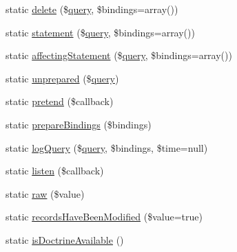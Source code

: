 \begin{DoxyCompactItemize}
\item 
static \mbox{\hyperlink{class_illuminate_1_1_support_1_1_facades_1_1_d_b_ae272dffec731836e5186ff97ac416ffa}{delete}} (\$\mbox{\hyperlink{class_illuminate_1_1_support_1_1_facades_1_1_d_b_ae52c1b74f0ded858ed2dae6342fe5d96}{query}}, \$bindings=array())
\item 
static \mbox{\hyperlink{class_illuminate_1_1_support_1_1_facades_1_1_d_b_abe9fe35abfd29aa9bccba94a269c9f25}{statement}} (\$\mbox{\hyperlink{class_illuminate_1_1_support_1_1_facades_1_1_d_b_ae52c1b74f0ded858ed2dae6342fe5d96}{query}}, \$bindings=array())
\item 
static \mbox{\hyperlink{class_illuminate_1_1_support_1_1_facades_1_1_d_b_a1ab200d539f4612e0baf5c935b8f73fe}{affecting\+Statement}} (\$\mbox{\hyperlink{class_illuminate_1_1_support_1_1_facades_1_1_d_b_ae52c1b74f0ded858ed2dae6342fe5d96}{query}}, \$bindings=array())
\item 
static \mbox{\hyperlink{class_illuminate_1_1_support_1_1_facades_1_1_d_b_a2e5507820b20e6d516bcdeb6c48bcc76}{unprepared}} (\$\mbox{\hyperlink{class_illuminate_1_1_support_1_1_facades_1_1_d_b_ae52c1b74f0ded858ed2dae6342fe5d96}{query}})
\item 
static \mbox{\hyperlink{class_illuminate_1_1_support_1_1_facades_1_1_d_b_adf2397397250068e4c6b7e9553963283}{pretend}} (\$callback)
\item 
static \mbox{\hyperlink{class_illuminate_1_1_support_1_1_facades_1_1_d_b_af5ee6d8571a55e7b07c56d40cfd1e131}{prepare\+Bindings}} (\$bindings)
\item 
static \mbox{\hyperlink{class_illuminate_1_1_support_1_1_facades_1_1_d_b_a638ffe152df52b7d57f27545b9b62696}{log\+Query}} (\$\mbox{\hyperlink{class_illuminate_1_1_support_1_1_facades_1_1_d_b_ae52c1b74f0ded858ed2dae6342fe5d96}{query}}, \$bindings, \$time=null)
\item 
static \mbox{\hyperlink{class_illuminate_1_1_support_1_1_facades_1_1_d_b_a8cce2150aaff55e9f96ab589308ef9aa}{listen}} (\$callback)
\item 
static \mbox{\hyperlink{class_illuminate_1_1_support_1_1_facades_1_1_d_b_ac62a351aae4b9c2bcb266ac28304c147}{raw}} (\$value)
\item 
static \mbox{\hyperlink{class_illuminate_1_1_support_1_1_facades_1_1_d_b_a25de82b576ec5d725caa28f2f121393b}{records\+Have\+Been\+Modified}} (\$value=true)
\item 
static \mbox{\hyperlink{class_illuminate_1_1_support_1_1_facades_1_1_d_b_ad3934fcbeb4d850ab6f0f16631d0d64e}{is\+Doctrine\+Available}} ()
\item 

\end{DoxyCompactItemize}
